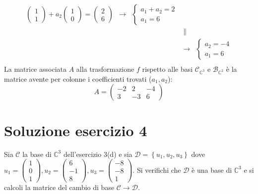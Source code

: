 \documentclass[a4paper]{article}
\begin{document}
\begin{equation*}
\begin{array}{lllll}
\begin{pmatrix}
				1 \\ 1
			\end{pmatrix} + a_{2}\begin{pmatrix}
				1 \\ 0
			\end{pmatrix} = \begin{pmatrix}
				2 \\ 6
			\end{pmatrix} &\rightarrow& \begin{cases}
				a_{1} + a_{2} = 2 \\
				a_{1} = 6
			\end{cases}  \\
			&& &\parallel& \\
			&& &\rightarrow& \begin{cases}
				a_{2} = -4 \\
				a_{1} = 6
			\end{cases} \\
		\end{array}
	\end{equation*}
	La matrice associata $A$ alla trasformazione $f$ rispetto alle basi $\mathscr{C}_{\mathbb{C}^{3}}$ e $\mathscr{B}_{\mathbb{C}^{2}}$ è la matrice avente per colonne i coefficienti trovati ($a_{1}, a_{2}$):
	\begin{equation*}
		A = \begin{pmatrix}
			-2 &  2 & -4 \\
			 3 & -3 &  6
		\end{pmatrix}
	\end{equation*}\newpage
	
	\section{Soluzione esercizio 4}
	
	Sia $\mathscr{C}$ la base di $\mathbb{C}^{3}$ dell'esercizio 3(d) e sia $\mathscr{D} = \left\{u_{1}, u_{2}, u_{3}\right\}$ dove $u_{1} = \begin{pmatrix}
		1 \\ 0 \\ 1
	\end{pmatrix}, u_{2} = \begin{pmatrix}
		6 \\ -1 \\ 8
	\end{pmatrix}, u_{3} = \begin{pmatrix}
		-8 \\ -8 \\ 1
	\end{pmatrix}$. Si verifichi che $\mathscr{D}$ è una base di $\mathbb{C}^{3}$ e si calcoli la matrice del cambio di base $\mathscr{C} \rightarrow \mathscr{D}$.\newline
	
\end{document}
